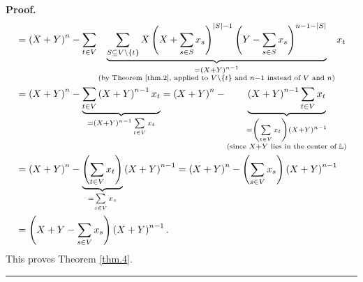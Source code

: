 \documentclass[numbers=enddot,12pt,final,onecolumn,notitlepage]{scrartcl}%
\theoremstyle{definition}
\newenvironment{proof}[1][Proof]{\noindent\textbf{#1.} }{\ \rule{0.5em}{0.5em}}
\let\sumnonlimits\sum
\renewcommand{\sum}{\sumnonlimits\limits}
\newenvironment{vershort}{}{}
\begin{document}
\begin{vershort}
\begin{proof}
\begin{align*}
&  =\left(  X+Y\right)  ^{n}-\sum_{t\in V}\underbrace{\sum_{S\subseteq
V\setminus\left\{  t\right\}  }X\left(  X+\sum_{s\in S}x_{s}\right)
^{\left\vert S\right\vert -1}\left(  Y-\sum_{s\in S}x_{s}\right)
^{n-1-\left\vert S\right\vert }}_{\substack{=\left(  X+Y\right)
^{n-1}\\\text{(by Theorem \ref{thm.2}, applied to }V\setminus\left\{
t\right\}  \text{ and }n-1\text{ instead of }V\text{ and }n\text{)}}}x_{t}\\
&  =\left(  X+Y\right)  ^{n}-\underbrace{\sum_{t\in V}\left(  X+Y\right)
^{n-1}x_{t}}_{=\left(  X+Y\right)  ^{n-1}\sum_{t\in V}x_{t}}=\left(
X+Y\right)  ^{n}-\underbrace{\left(  X+Y\right)  ^{n-1}\sum_{t\in V}x_{t}%
}_{\substack{=\left(  \sum_{t\in V}x_{t}\right)  \left(  X+Y\right)
^{n-1}\\\text{(since }X+Y\text{ lies in the center of }\mathbb{L}\text{)}}}\\
&  =\left(  X+Y\right)  ^{n}-\underbrace{\left(  \sum_{t\in V}x_{t}\right)
}_{=\sum_{s\in V}x_{s}}\left(  X+Y\right)  ^{n-1}=\left(  X+Y\right)
^{n}-\left(  \sum_{s\in V}x_{s}\right)  \left(  X+Y\right)  ^{n-1}\\
&  =\left(  X+Y-\sum_{s\in V}x_{s}\right)  \left(  X+Y\right)  ^{n-1}.
\end{align*}
This proves Theorem \ref{thm.4}.
\end{proof}
\end{vershort}
\end{document}
